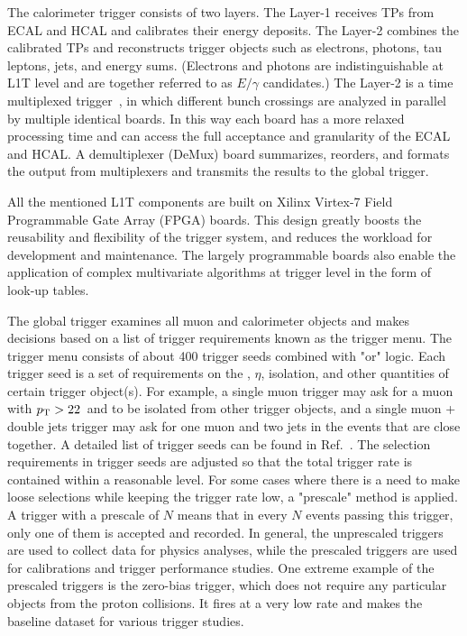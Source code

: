 The calorimeter trigger consists of two layers. 
The Layer-1 receives TPs from ECAL and HCAL and calibrates their energy deposits. 
The Layer-2 combines the calibrated TPs and reconstructs trigger objects such as electrons, photons, tau leptons, jets, and energy sums.
(Electrons and photons are indistinguishable at L1T level and are together referred to as $E/\gamma$ candidates.)
The Layer-2 is a time multiplexed trigger~\cite{Frazier_2012}, in which different bunch crossings are analyzed in parallel by multiple identical boards. 
In this way each board has a more relaxed processing time and can access the full acceptance and granularity of the ECAL and HCAL.
A demultiplexer (DeMux) board summarizes, reorders, and formats the output from multiplexers and transmits the results to the global trigger.

All the mentioned L1T components are built on Xilinx Virtex-7 Field Programmable Gate Array (FPGA) boards.
This design greatly boosts the reusability and flexibility of the trigger system, and reduces the workload for development and maintenance.
The largely programmable boards also enable the application of complex multivariate algorithms at trigger level in the form of look-up tables.

The global trigger examines all muon and calorimeter objects and makes decisions based on a list of trigger requirements known as the trigger menu.
The trigger menu consists of about 400 trigger seeds combined with "or" logic.
Each trigger seed is a set of requirements on the \pt, $\eta$, isolation, and other quantities of certain trigger object(s).
For example, a single muon trigger may ask for a muon with $p_{\mathrm{T}} > 22$~\GeV and to be isolated from other trigger objects, 
and a single muon + double jets trigger may ask for one muon and two jets in the events that are close together.
A detailed list of trigger seeds can be found in Ref.~\cite{l1t_perform}.
The selection requirements in trigger seeds are adjusted so that the total trigger rate is contained within a reasonable level.
For some cases where there is a need to make loose selections while keeping the trigger rate low, a "prescale" method is applied.
A trigger with a prescale of $N$ means that in every $N$ events passing this trigger, only one of them is accepted and recorded.
In general, the unprescaled triggers are used to collect data for physics analyses, 
while the prescaled triggers are used for calibrations and trigger performance studies.
One extreme example of the prescaled triggers is the zero-bias trigger, 
which does not require any particular objects from the proton collisions.
It fires at a very low rate and makes the baseline dataset for various trigger studies.

